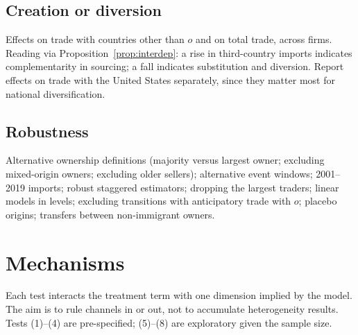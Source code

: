 \documentclass[12pt]{article}
\theoremstyle{remark}
\newcommand{\planned}[1]{\textcolor{OliveGreen}{#1}}
\begin{document}
\subsection{Creation or diversion}

\planned{Effects on trade with countries other than $o$ and on total trade,
across firms. Reading via Proposition~\ref{prop:interdep}: a rise in
third-country imports indicates complementarity in sourcing; a fall indicates
substitution and diversion. Report effects on trade with the United States
separately, since they matter most for national diversification.}

\subsection{Robustness}

\planned{Alternative ownership definitions (majority versus largest owner;
excluding mixed-origin owners; excluding older sellers); alternative event
windows; 2001--2019 imports; robust staggered estimators; dropping the
largest traders; linear models in levels; excluding transitions with
anticipatory trade with $o$; placebo origins; transfers between non-immigrant
owners.}

\section{Mechanisms}
\label{sec:mechanisms}

\planned{Each test interacts the treatment term with one dimension implied by
the model. The aim is to rule channels in or out, not to accumulate
heterogeneity results. Tests (1)--(4) are pre-specified; (5)--(8) are
exploratory given the sample size.}
\end{document}
